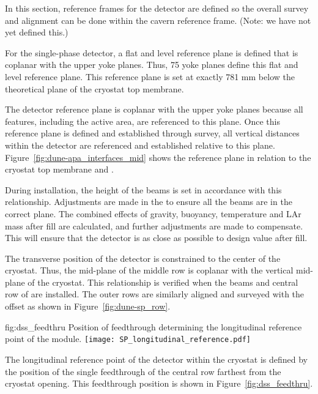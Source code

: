 In this section, reference frames for the detector are defined so the
overall survey and alignment can be done within the cavern reference
frame. (Note: we have not yet defined this.)


For the single-phase detector, a flat and level reference plane is
defined that is coplanar with the upper  yoke planes. Thus,
75 yoke planes define this flat and level reference plane. This
reference plane is set at exactly 781 mm below the theoretical plane
of the cryostat top membrane.


The detector reference plane is coplanar with the upper 
yoke planes because all features, including the active area, are
referenced to this plane.  Once this reference plane is defined and
established through survey, all vertical distances within the detector
are referenced and established relative to this plane.
Figure~\ref{fig:dune-apa_interfaces_mid} shows the reference plane in
relation to the cryostat top membrane and .


During installation, the height of the  beams is set in
accordance with this relationship. Adjustments are made in the
 to ensure all the beams are in the correct plane. The
combined effects of gravity, buoyancy, temperature and LAr mass after
fill are calculated, and further adjustments are made to
compensate. This will ensure that the detector is as close as possible
to design value after fill.


The transverse position of the detector is constrained to the center
of the cryostat. Thus, the mid-plane of the middle row  is
coplanar with the vertical mid-plane of the cryostat. This
relationship is verified when the  beams and central row of
 are installed. The outer rows are similarly aligned and
surveyed with the offset as shown in Figure~\ref{fig:dune-sp_row}.
\begin{dunefigure}{fig:dss_feedthru}
  {Position of feedthrough determining the longitudinal reference point of the  module.}
  \texttt{[image: SP\_longitudinal\_reference.pdf]}
\end{dunefigure}


The longitudinal reference point of the detector within the cryostat
is defined by the position of the single feedthrough of the central row
farthest from the cryostat opening. This feedthrough position
is shown in Figure~\ref{fig:dss_feedthru}.


